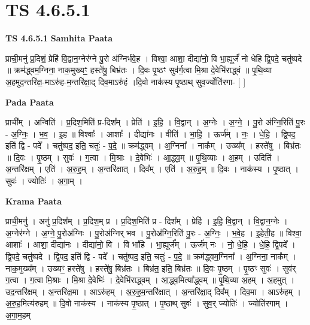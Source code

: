 \documentclass[17pt]{extarticle}
\begin{document}
\section{ TS 4.6.5.1 }

\textbf{TS 4.6.5.1 } \newline
\textbf{Samhita Paata} \newline

प्राची॒मनु॑ प्र॒दिशं॒ प्रेहि॑ वि॒द्वान॒ग्नेर॑ग्ने पु॒रो अ॑ग्निर्भवे॒ह । विश्वा॒ आशा॒ दीद्या॑नो॒ वि भा॒ह्यूर्जं॑ नो धेहि द्वि॒पदे॒ चतु॑ष्पदे ॥ क्रम॑द्ध्वम॒ग्निना॒ नाक॒मुख्यꣳ॒॒ हस्ते॑षु॒ बिभ्र॑तः । दि॒वः पृ॒ष्ठꣳ सुव॑र्ग॒त्वा मि॒श्रा दे॒वेभि॑राद्ध्वं ॥ पृ॒थि॒व्या अ॒हमुद॒न्तरि॑क्ष॒-माऽरु॑ह-म॒न्तरि॑क्षा॒द् दिव॒माऽरु॑हं ।दि॒वो नाक॑स्य पृ॒ष्ठाथ् सुव॒र्ज्योति॑रगा- [  ] \newline

\textbf{Pada Paata} \newline

प्राची᳚म् । अन्विति॑ । प्र॒दिश॒मिति॑ प्र-दिश᳚म् । प्रेति॑ । इ॒हि॒ । वि॒द्वान् । अ॒ग्नेः । अ॒ग्ने॒ । पु॒रो अ॑ग्नि॒रिति॑ पु॒रः - अ॒ग्निः॒ । भ॒व॒ । इ॒ह ॥ विश्वाः᳚ । आशाः᳚ । दीद्या॑नः । वीति॑ । भा॒हि॒ । ऊर्ज᳚म् । नः॒ । धे॒हि॒ । द्वि॒पद॒ इति॑ द्वि - पदे᳚ । चतु॑ष्पद॒ इति॒ चतुः॑ - प॒दे॒ ॥ क्रम॑द्ध्वम् । अ॒ग्निना᳚ । नाक᳚म् । उख्य᳚म् । हस्ते॑षु । बिभ्र॑तः ॥ दि॒वः । पृ॒ष्ठम् । सुवः॑ । ग॒त्वा । मि॒श्राः । दे॒वेभिः॑ । आ॒द्ध्व॒म् ॥ पृ॒थि॒व्याः । अ॒हम् । उदिति॑ । अ॒न्तरि॑क्षम् । एति॑ । अ॒रु॒ह॒म् । अ॒न्तरि॑क्षात् । दिव᳚म् । एति॑ । अ॒रु॒ह॒म् ॥ दि॒वः । नाक॑स्य । पृ॒ष्ठात् । सुवः॑ । ज्योतिः॑ । अ॒गा॒म् ।  \newline


\textbf{Krama Paata} \newline

प्राची॒मनु॑ । अनु॑ प्र॒दिश᳚म् । प्र॒दिश॒म् प्र । प्र॒दिश॒मिति॑ प्र - दिश᳚म् । प्रेहि॑ । इ॒हि॒ वि॒द्वान् । वि॒द्वान॒ग्नेः । अ॒ग्नेर॑ग्ने । अ॒ग्ने॒ पु॒रोअ॑ग्निः । पु॒रोअ॑ग्निर् भव । पु॒रोअ॑ग्नि॒रिति॑ पु॒रः - अ॒ग्निः॒ । भ॒वे॒ह । इ॒हेती॒ह ॥ विश्वा॒ आशाः᳚ । आशा॒ दीद्या॑नः । दीद्या॑नो॒ वि । वि भा॑हि । भा॒ह्यूर्ज᳚म् । ऊर्ज॑म् नः । नो॒ धे॒हि॒ । धे॒हि॒ द्वि॒पदे᳚ । द्वि॒पदे॒ चतु॑ष्पदे । द्वि॒पद॒ इति॑ द्वि - पदे᳚ । चतु॑ष्पद॒ इति॒ चतुः॑ - प॒दे॒ ॥ क्रम॑द्ध्वम॒ग्निना᳚ । अ॒ग्निना॒ नाक᳚म् । नाक॒मुख्य᳚म् । उख्यꣳ॒॒ हस्ते॑षु । हस्ते॑षु॒ बिभ्र॑तः । बिभ्र॑त॒ इति॒ बिभ्र॑तः ॥ दि॒वः पृ॒ष्ठम् । पृ॒ष्ठꣳ सुवः॑ । सुव॑र् ग॒त्वा । ग॒त्वा मि॒श्राः । मि॒श्रा दे॒वेभिः॑ । दे॒वेभि॑राद्ध्वम् । आ॒द्ध्व॒मित्या᳚द्ध्वम् ॥ पृ॒थि॒व्या अ॒हम् । अ॒हमुत् । उद॒न्तरि॑क्षम् । अ॒न्तरि॑क्ष॒मा । आऽरु॑हम् । अ॒रु॒ह॒म॒न्तरि॑क्षात् । अ॒न्तरि॑क्षा॒द् दिव᳚म् । दिव॒मा । आऽरु॑हम् । अ॒रु॒ह॒मित्य॑रुहम् ॥ दि॒वो नाक॑स्य । नाक॑स्य पृ॒ष्ठात् । पृ॒ष्ठाथ् सुवः॑ । सुव॒र् ज्योतिः॑ । ज्योति॑रगाम् । अ॒गा॒म॒हम् \newline
\end{document}
